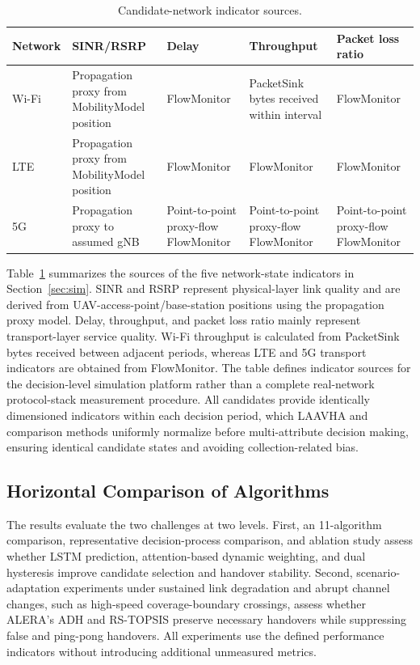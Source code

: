 \documentclass[remotesensing,article,submit,moreauthors]{Definitions/mdpi}
\begin{document}
\begin{table}[H]
\centering
\caption{Candidate-network indicator sources.}
\small
\begin{tabularx}{\textwidth}{>{\raggedright\arraybackslash}p{1.3cm}>{\raggedright\arraybackslash}X>{\raggedright\arraybackslash}X>{\raggedright\arraybackslash}X>{\raggedright\arraybackslash}X}
\toprule
\textbf{Network} & \textbf{SINR/RSRP} & \textbf{Delay} & \textbf{Throughput} & \textbf{Packet loss ratio} \\
\midrule
Wi-Fi & Propagation proxy from MobilityModel position & FlowMonitor & PacketSink bytes received within interval & FlowMonitor \\
LTE & Propagation proxy from MobilityModel position & FlowMonitor & FlowMonitor & FlowMonitor \\
5G & Propagation proxy to assumed gNB & Point-to-point proxy-flow FlowMonitor & Point-to-point proxy-flow FlowMonitor & Point-to-point proxy-flow FlowMonitor \\
\bottomrule
\end{tabularx}
\label{tab:metrics}
\end{table}

Table~\ref{tab:metrics} summarizes the sources of the five network-state indicators in Section~\ref{sec:sim}. SINR and RSRP represent physical-layer link quality and are derived from UAV-access-point/base-station positions using the propagation proxy model. Delay, throughput, and packet loss ratio mainly represent transport-layer service quality. Wi-Fi throughput is calculated from PacketSink bytes received between adjacent periods, whereas LTE and 5G transport indicators are obtained from FlowMonitor. The table defines indicator sources for the decision-level simulation platform rather than a complete real-network protocol-stack measurement procedure. All candidates provide identically dimensioned indicators within each decision period, which LAAVHA and comparison methods uniformly normalize before multi-attribute decision making, ensuring identical candidate states and avoiding collection-related bias.

\subsection{Horizontal Comparison of Algorithms}\label{sec:hcomp}

The results evaluate the two challenges at two levels. First, an 11-algorithm comparison, representative decision-process comparison, and ablation study assess whether LSTM prediction, attention-based dynamic weighting, and dual hysteresis improve candidate selection and handover stability. Second, scenario-adaptation experiments under sustained link degradation and abrupt channel changes, such as high-speed coverage-boundary crossings, assess whether ALERA's ADH and RS-TOPSIS preserve necessary handovers while suppressing false and ping-pong handovers. All experiments use the defined performance indicators without introducing additional unmeasured metrics.
\end{document}
